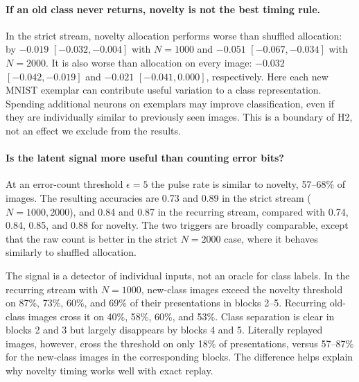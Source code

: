 \documentclass[11pt,a4paper]{article}
\begin{document}
\paragraph{If an old class never returns, novelty is not the best timing rule.}
In the strict stream, novelty allocation performs worse than shuffled allocation: by $-0.019$ $[-0.032,-0.004]$ with $N=1000$ and $-0.051$ $[-0.067,-0.034]$ with $N=2000$. It is also worse than allocation on every image: $-0.032$ $[-0.042,-0.019]$ and $-0.021$ $[-0.041,0.000]$, respectively. Here each new MNIST exemplar can contribute useful variation to a class representation. Spending additional neurons on exemplars may improve classification, even if they are individually similar to previously seen images. This is a boundary of H2, not an effect we exclude from the results.

\paragraph{Is the latent signal more useful than counting error bits?}
At an error-count threshold $\epsilon=5$ the pulse rate is similar to novelty, 57--68\% of images. The resulting accuracies are 0.73 and 0.89 in the strict stream ($N=1000,2000$), and 0.84 and 0.87 in the recurring stream, compared with 0.74, 0.84, 0.85, and 0.88 for novelty. The two triggers are broadly comparable, except that the raw count is better in the strict $N=2000$ case, where it behaves similarly to shuffled allocation.

The signal is a detector of individual inputs, not an oracle for class labels. In the recurring stream with $N=1000$, new-class images exceed the novelty threshold on 87\%, 73\%, 60\%, and 69\% of their presentations in blocks 2--5. Recurring old-class images cross it on 40\%, 58\%, 60\%, and 53\%. Class separation is clear in blocks 2 and 3 but largely disappears by blocks 4 and 5. Literally replayed images, however, cross the threshold on only 18\% of presentations, versus 57--87\% for the new-class images in the corresponding blocks. The difference helps explain why novelty timing works well with exact replay.
\end{document}
